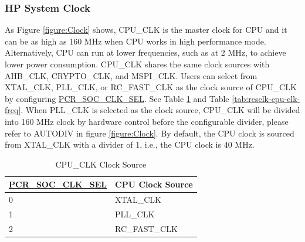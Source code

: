 \documentclass[main\_\_EN.tex]{subfiles}
\begin{document}
\subsubsection{HP System Clock}

As Figure \ref{figure:Clock} shows, CPU\_CLK is the master clock for CPU and it can be as high as 160 MHz when CPU works in high performance mode. Alternatively, CPU can run at lower frequencies, such as at 2 MHz, to achieve lower power consumption. CPU\_CLK shares the same clock sources with AHB\_CLK, CRYPTO\_CLK, and MSPI\_CLK. Users can select from XTAL\_CLK, PLL\_CLK, or RC\_FAST\_CLK as the clock source of CPU\_CLK by configuring  \hyperref[fielddesc:PCRSOCCLKSEL]{PCR\_SOC\_CLK\_SEL}. See Table  \ref{tab:resclk-cpu-clk-src} and Table  \ref{tab:resclk-cpu-clk-freq}. When PLL\_CLK is selected as the clock source, CPU\_CLK will be divided into 160 MHz clock by hardware control before the configurable divider, please refer to AUTODIV in figure \ref{figure:Clock}. By default, the CPU clock is sourced from XTAL\_CLK with a divider of 1, i.e., the CPU clock is 40 MHz.

\begin{longtable}[c]{|p{5cm}|p{5cm}| }
       \caption{CPU\_CLK Clock Source}
		\label{tab:resclk-cpu-clk-src} \\
	    \hline
        \rowcolor{lightgray}
        \textbf{\hyperref[fielddesc:PCRSOCCLKSEL]{PCR\_SOC\_CLK\_SEL}} & \textbf{CPU Clock Source} \\
        \hline
        0 & XTAL\_CLK \\
        \hline
        1 & PLL\_CLK \\
        \hline
        2 & RC\_FAST\_CLK \\
        \hline
\end{longtable}
\end{document}
